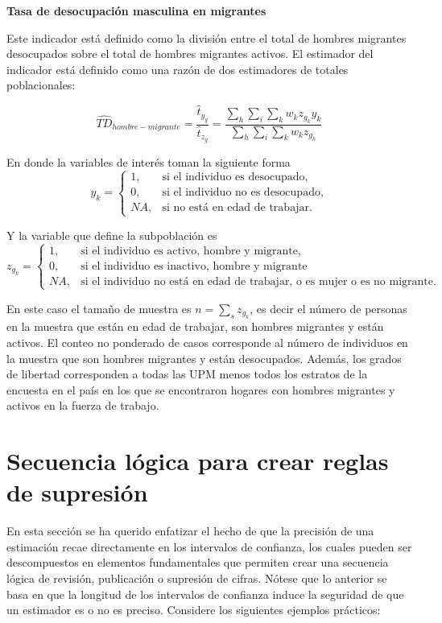 \documentclass[
  12pt,
]{book}
\begin{document}
\textbf{Tasa de desocupación masculina en migrantes}

Este indicador está definido como la división entre el total de hombres migrantes desocupados sobre el total de hombres migrantes activos. El estimador del indicador está definido como una razón de dos estimadores de totales poblacionales:

\[
\widehat{TD}_{hombre-migrante} =  \frac{\hat t_{y_g}}{\hat t_{z_g}} =\frac{\sum_h\sum_i\sum_k w_kz_{g_k}y_{k}}{\sum_h\sum_i\sum_k w_kz_{g_k}}
\]

En donde la variables de interés toman la siguiente forma
\[
y_{k}=
\begin{cases}
1, &\text{si el individuo es desocupado,}\\
0, &\text{si el individuo no es desocupado,}\\
NA, &\text{si no está en edad de trabajar.}
\end{cases}
\]

Y la variable que define la subpoblación es
\[
z_{g_k}=
\begin{cases}
1, &\text{si el individuo es activo, hombre y migrante,}\\
0, &\text{si el individuo es inactivo, hombre y migrante}\\
NA, &\text{si el individuo no está en edad de trabajar, o es mujer o es no migrante.}
\end{cases}
\]

En este caso el tamaño de muestra es \(n = \sum_s z_{g_k}\), es decir el número de personas en la muestra que están en edad de trabajar, son hombres migrantes y están activos. El conteo no ponderado de casos corresponde al número de individuos en la muestra que son hombres migrantes y están desocupados. Además, los grados de libertad corresponden a todas las UPM menos todos los estratos de la encuesta en el país en los que se encontraron hogares con hombres migrantes y activos en la fuerza de trabajo.

\hypertarget{secuencia-luxf3gica-para-crear-reglas-de-supresiuxf3n}{%
\section{Secuencia lógica para crear reglas de supresión}\label{secuencia-luxf3gica-para-crear-reglas-de-supresiuxf3n}}

En esta sección se ha querido enfatizar el hecho de que la precisión de una estimación recae directamente en los intervalos de confianza, los cuales pueden ser descompuestos en elementos fundamentales que permiten crear una secuencia lógica de revisión, publicación o supresión de cifras. Nótese que lo anterior se basa en que la longitud de los intervalos de confianza induce la seguridad de que un estimador es o no es preciso. Considere los siguientes ejemplos prácticos:
\end{document}
